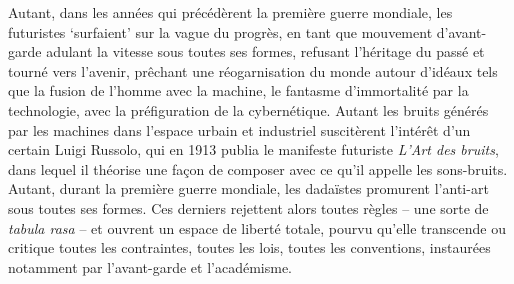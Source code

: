 \documentclass{article}
\begin{document}
Autant, dans les années qui précédèrent la première guerre mondiale, les futuristes `surfaient' sur la vague du progrès, en tant que mouvement d'avant-garde adulant la vitesse sous toutes ses formes, refusant l'héritage du passé et tourné vers l'avenir, prêchant une réogarnisation du monde autour d'idéaux tels que la fusion de l’homme avec la machine, le fantasme d'immortalité par la technologie, avec la préfiguration de la cybernétique. Autant les bruits générés par les machines dans l'espace urbain et industriel suscitèrent l'intérêt d'un certain Luigi Russolo, qui en 1913 publia le manifeste futuriste \textit{L'Art des bruits}, %
dans lequel il théorise une façon de composer avec ce qu'il appelle les sons-bruits. 
Autant, durant la première guerre mondiale, les dadaïstes promurent l'anti-art sous toutes ses formes. Ces derniers rejettent alors toutes règles -- une sorte de \textit{tabula rasa} -- et ouvrent un espace de liberté totale, pourvu qu'elle transcende ou critique toutes les contraintes, toutes les lois, toutes les conventions, instaurées notamment par l'avant-garde et l'académisme. 

\end{document}
